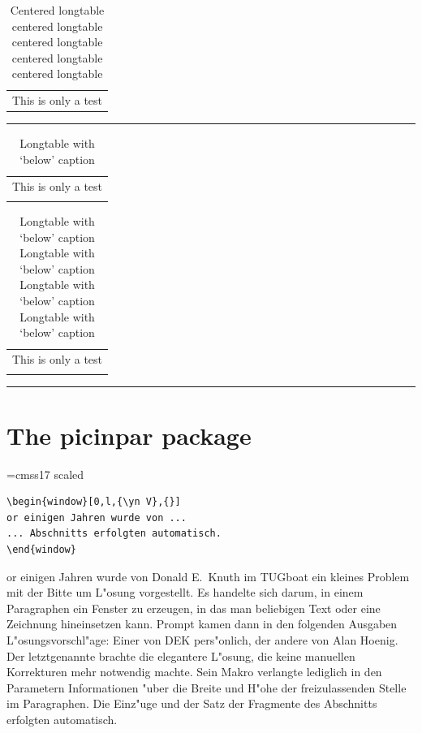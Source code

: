 \begin{longtable}[c]{l}
\caption[Centered longtable (2)]%
        {Centered longtable centered longtable centered longtable
         centered longtable centered longtable}\label{longtable.6}\\
This is only a test\\
\end{longtable}

\noindent\rule{\textwidth}{1pt}%

\begin{longtable}{c}
This is only a test\\
\caption{Longtable with `below' caption}\label{longtable.7}\\
\end{longtable}

\begin{longtable}{c}
This is only a test\\
\caption[Longtable with `below' caption (2)]%
        {Longtable with `below' caption Longtable with `below' caption
         Longtable with `below' caption Longtable with `below' caption}\label{longtable.8}\\
\end{longtable}

\noindent\rule{\textwidth}{1pt}%
\fi

\ifx\window\undefined \else
\clearpage
\section{The picinpar package}

\font\yn=cmss17 scaled  %
\begin{verbatim}
\begin{window}[0,l,{\yn V},{}]
or einigen Jahren wurde von ...
... Abschnitts erfolgten automatisch.
\end{window}
\end{verbatim}

\begin{window}[0,l,{\yn V},{}]
or einigen Jahren wurde von Donald E.~Knuth im TUGboat ein kleines
Problem mit der Bitte um L"osung vorgestellt. Es handelte sich darum,
in einem Paragraphen ein Fenster zu erzeugen, in das man beliebigen Text
oder eine Zeichnung hineinsetzen kann. Prompt kamen dann in den folgenden
Ausgaben L"osungsvorschl"age: Einer von DEK pers"onlich, der andere von
Alan Hoenig. Der letztgenannte brachte die elegantere L"osung, die keine
manuellen Korrekturen mehr notwendig machte. Sein Makro verlangte lediglich
in den Parametern Informationen "uber die Breite und H"ohe der
freizulassenden Stelle im Paragraphen. Die Einz"uge und der Satz der
Fragmente des Abschnitts erfolgten automatisch.
\end{window}

